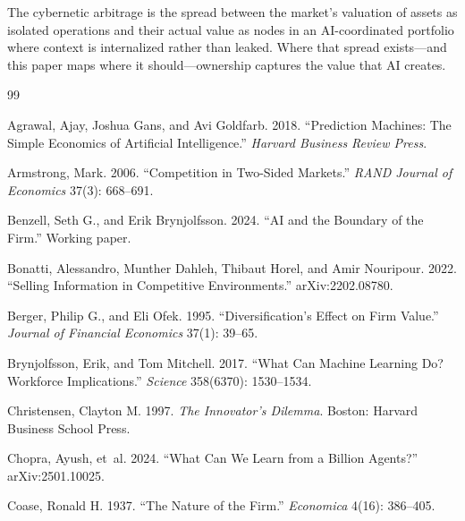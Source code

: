 \documentclass[12pt]{article}
\theoremstyle{definition}
\begin{document}
The cybernetic arbitrage is the spread between the market's valuation of assets as isolated operations and their actual value as nodes in an AI-coordinated portfolio where context is internalized rather than leaked. Where that spread exists---and this paper maps where it should---ownership captures the value that AI creates.




\begin{thebibliography}{99}

Agrawal, Ajay, Joshua Gans, and Avi Goldfarb. 2018. ``Prediction Machines: The Simple Economics of Artificial Intelligence.'' \textit{Harvard Business Review Press}.

Armstrong, Mark. 2006. ``Competition in Two-Sided Markets.'' \textit{RAND Journal of Economics} 37(3): 668--691.

Benzell, Seth G., and Erik Brynjolfsson. 2024. ``AI and the Boundary of the Firm.'' Working paper.

Bonatti, Alessandro, Munther Dahleh, Thibaut Horel, and Amir Nouripour. 2022. ``Selling Information in Competitive Environments.'' arXiv:2202.08780.

Berger, Philip G., and Eli Ofek. 1995. ``Diversification's Effect on Firm Value.'' \textit{Journal of Financial Economics} 37(1): 39--65.

Brynjolfsson, Erik, and Tom Mitchell. 2017. ``What Can Machine Learning Do? Workforce Implications.'' \textit{Science} 358(6370): 1530--1534.

Christensen, Clayton M. 1997. \textit{The Innovator's Dilemma}. Boston: Harvard Business School Press.

Chopra, Ayush, et~al. 2024. ``What Can We Learn from a Billion Agents?'' arXiv:2501.10025.

Coase, Ronald H. 1937. ``The Nature of the Firm.'' \textit{Economica} 4(16): 386--405.


\end{thebibliography}
\end{document}
